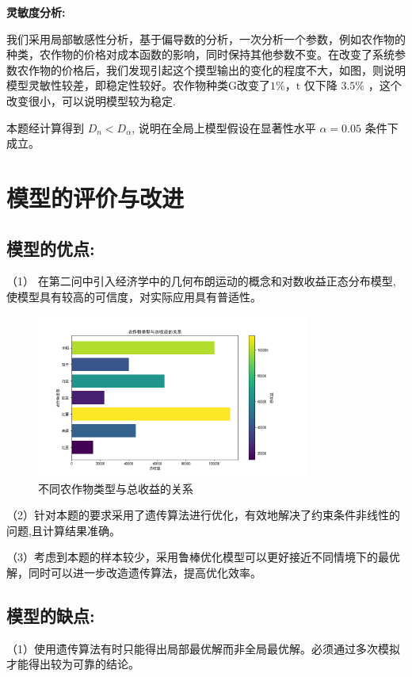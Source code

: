 \documentclass[12pt]{ctexart}
\begin{document}
	
	\textbf{灵敏度分析:}
	
	
	我们采用局部敏感性分析，基于偏导数的分析，一次分析一个参数，例如农作物的种类，农作物的价格对成本函数的影响，同时保持其他参数不变。在改变了系统参数农作物的价格后，我们发现引起这个摸型输出的变化的程度不大，如图，则说明模型灵敏性较差，即稳定性较好。农作物种类G改变了$1\% ，\mathrm{t}$ 仅下降 $3.5\%$ ，这个改变很小，可以说明模型较为稳定.
	
	本题经计算得到 $D_n<D_\alpha$, 说明在全局上模型假设在显著性水平 $\alpha=0.05$ 条件下成立。
	
	
	
	
	
	
	
	
	
	
	
	\section{模型的评价与改进}  
	\label{sec:evaluation}  
	\subsection{模型的优点:}	
	
	（1） 在第二问中引入经济学中的几何布朗运动的概念和对数收益正态分布模型, 使模型具有较高的可信度，对实际应用具有普适性。
		\begin{figure}[h]
		\centering
		\includegraphics[width=0.8\textwidth]{image16.png}  %
		\caption{不同农作物类型与总收益的关系}
		\label{fig:yield_comparison1}
	\end{figure}
	
	（2）针对本题的要求采用了遗传算法进行优化，有效地解决了约束条件非线性的问题,且计算结果准确。
	
	
	（3）考虑到本题的样本较少，采用鲁棒优化模型可以更好接近不同情境下的最优解，同时可以进一步改造遗传算法，提高优化效率。
	\subsection{模型的缺点:}	
	（1）使用遗传算法有时只能得出局部最优解而非全局最优解。必须通过多次模拟才能得出较为可靠的结论。
	
\end{document}
